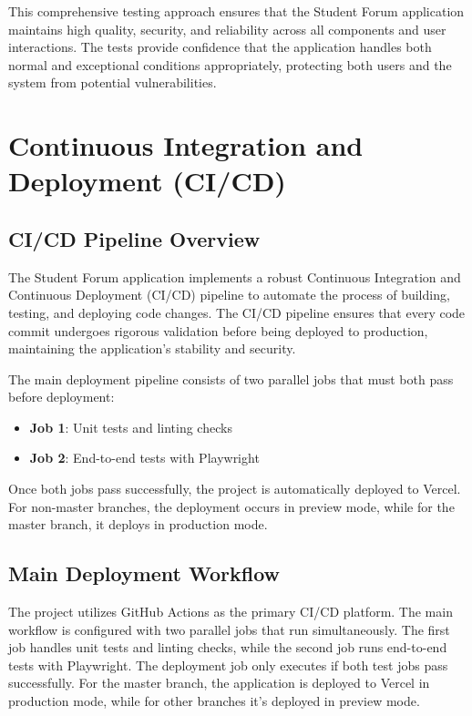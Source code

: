 This comprehensive testing approach ensures that the Student Forum application maintains high quality, security, and reliability across all components and user interactions. The tests provide confidence that the application handles both normal and exceptional conditions appropriately, protecting both users and the system from potential vulnerabilities.

\section{Continuous Integration and Deployment (CI/CD)}

\subsection{CI/CD Pipeline Overview}

The Student Forum application implements a robust Continuous Integration and Continuous Deployment (CI/CD) pipeline to automate the process of building, testing, and deploying code changes. The CI/CD pipeline ensures that every code commit undergoes rigorous validation before being deployed to production, maintaining the application's stability and security.

The main deployment pipeline consists of two parallel jobs that must both pass before deployment:
\begin{itemize}
    \item \textbf{Job 1}: Unit tests and linting checks
    \item \textbf{Job 2}: End-to-end tests with Playwright
\end{itemize}

Once both jobs pass successfully, the project is automatically deployed to Vercel. For non-master branches, the deployment occurs in preview mode, while for the master branch, it deploys in production mode.

\subsection{Main Deployment Workflow}

The project utilizes GitHub Actions as the primary CI/CD platform. The main workflow is configured with two parallel jobs that run simultaneously. The first job handles unit tests and linting checks, while the second job runs end-to-end tests with Playwright. The deployment job only executes if both test jobs pass successfully. For the master branch, the application is deployed to Vercel in production mode, while for other branches it's deployed in preview mode.

